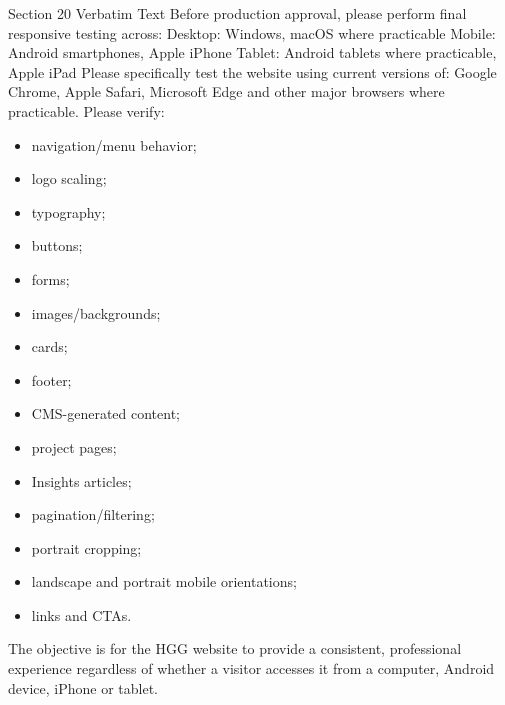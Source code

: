 \documentclass[11pt,a4paper]{article}
\begin{document}
\begin{VerbatimClientBox}{Section 20 Verbatim Text}
Before production approval, please perform final responsive testing across:
Desktop: Windows, macOS where practicable
Mobile: Android smartphones, Apple iPhone
Tablet: Android tablets where practicable, Apple iPad
Please specifically test the website using current versions of: Google Chrome, Apple Safari, Microsoft Edge and other major browsers where practicable.
Please verify:
\begin{itemize}[noitemsep]
    \item navigation/menu behavior;
    \item logo scaling;
    \item typography;
    \item buttons;
    \item forms;
    \item images/backgrounds;
    \item cards;
    \item footer;
    \item CMS-generated content;
    \item project pages;
    \item Insights articles;
    \item pagination/filtering;
    \item portrait cropping;
    \item landscape and portrait mobile orientations;
    \item links and CTAs.
\end{itemize}
The objective is for the HGG website to provide a consistent, professional experience regardless of whether a visitor accesses it from a computer, Android device, iPhone or tablet.
\end{VerbatimClientBox}
\end{document}
